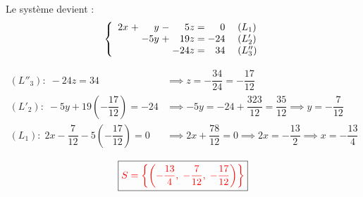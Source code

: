 \documentclass[12pt,a4paper]{article}
\begin{document}
\begin{enumerate}
\vspace{0.4cm}
\noindent
Le système devient :
\[
\left\{
\begin{array}{r@{\;}c@{\;}r@{\;}c@{\;}r@{\;=\;}r}
2x & + &   y & - &   5z &   0 \\
   &   & -5y & + &  19z & -24 \\
   &   &     &   & -24z &  34
\end{array}
\right.
\begin{array}{l}
(L_1) \\
(L'_2) \\
(L''_3)
\end{array}
\]

\begin{align*}
(L''_3) :\; -24z = 34 &\implies z = -\dfrac{34}{24} = -\dfrac{17}{12} \\[6pt]
(L'_2) :\; -5y + 19\left(-\dfrac{17}{12}\right) = -24 &\implies -5y = -24 + \dfrac{323}{12} = \dfrac{35}{12} \implies y = -\dfrac{7}{12} \\[6pt]
(L_1) :\; 2x - \dfrac{7}{12} - 5\left(-\dfrac{17}{12}\right) = 0 &\implies 2x + \dfrac{78}{12} = 0 \implies 2x = -\dfrac{13}{2} \implies x = -\dfrac{13}{4}
\end{align*}

\[
\boxed{\textcolor{red}{S = \left\lbrace \left(-\dfrac{13}{4},\; -\dfrac{7}{12},\; -\dfrac{17}{12}\right) \right\rbrace}}
\]

\end{enumerate}
\end{document}
